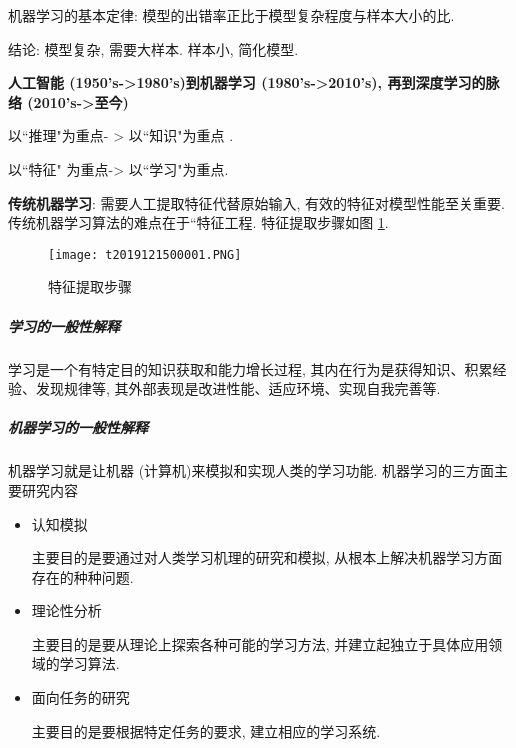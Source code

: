 机器学习的基本定律: 模型的出错率正比于模型复杂程度与样本大小的比.

结论:  模型复杂, 需要大样本. 样本小, 简化模型.

\textbf{人工智能 (1950's->1980's)到机器学习 (1980's->2010's), 再到深度学习的脉络 (2010's->至今)}
\begin{center}
以“推理"为重点- > 以“知识"为重点 .

以“特征" 为重点-> 以“学习"为重点.
\end{center}

\textbf{传统机器学习}:  需要人工提取特征代替原始输入, 有效的特征对模型性能至关重要. 传统机器学习算法的难点在于“特征工程. 特征提取步骤如图 \ref{AI32fig2019121501}.
\begin{figure}[H]
\centering
\texttt{[image: t2019121500001.PNG]}
\caption{特征提取步骤}
\label{AI32fig2019121501}
\end{figure}
\subparagraph{学习的一般性解释}
学习是一个有特定目的知识获取和能力增长过程, 其内在行为是获得知识、积累经验、发现规律等, 其外部表现是改进性能、适应环境、实现自我完善等.
\subparagraph{机器学习的一般性解释}
机器学习就是让机器 (计算机)来模拟和实现人类的学习功能.
机器学习的三方面主要研究内容
\begin{itemize}
\item 认知模拟

    主要目的是要通过对人类学习机理的研究和模拟, 从根本上解决机器学习方面存在的种种问题.
\item 理论性分析

     主要目的是要从理论上探索各种可能的学习方法, 并建立起独立于具体应用领域的学习算法.
\item 面向任务的研究

    主要目的是要根据特定任务的要求, 建立相应的学习系统.
\end{itemize}

